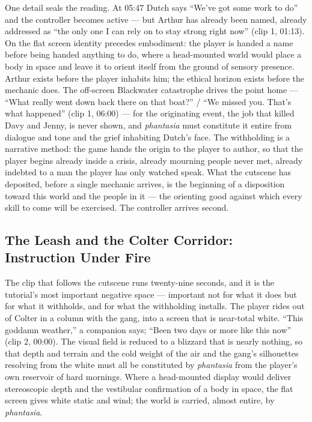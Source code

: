 \documentclass{article}
\begin{document}
One detail seals the reading. At 05:47 Dutch says ``We've got some work to do'' and the controller becomes active — but Arthur has already been named, already addressed as ``the only one I can rely on to stay strong right now'' (clip 1, 01:13). On the flat screen identity precedes embodiment: the player is handed a name before being handed anything to do, where a head-mounted world would place a body in space and leave it to orient itself from the ground of sensory presence. Arthur exists before the player inhabits him; the ethical horizon exists before the mechanic does. The off-screen Blackwater catastrophe drives the point home — ``What really went down back there on that boat?'' / ``We missed you. That's what happened'' (clip 1, 06:00) — for the originating event, the job that killed Davy and Jenny, is never shown, and \textit{phantasia} must constitute it entire from dialogue and tone and the grief inhabiting Dutch's face. The withholding is a narrative method: the game hands the origin to the player to author, so that the player begins already inside a crisis, already mourning people never met, already indebted to a man the player has only watched speak. What the cutscene has deposited, before a single mechanic arrives, is the beginning of a disposition toward this world and the people in it — the orienting good against which every skill to come will be exercised. The controller arrives second.

\bigskip

\subsection*{The Leash and the Colter Corridor: Instruction Under Fire}

The clip that follows the cutscene runs twenty-nine seconds, and it is the tutorial's most important negative space — important not for what it does but for what it withholds, and for what the withholding installs. The player rides out of Colter in a column with the gang, into a screen that is near-total white. ``This goddamn weather,'' a companion says; ``Been two days or more like this now'' (clip 2, 00:00). The visual field is reduced to a blizzard that is nearly nothing, so that depth and terrain and the cold weight of the air and the gang's silhouettes resolving from the white must all be constituted by \textit{phantasia} from the player's own reservoir of hard mornings. Where a head-mounted display would deliver stereoscopic depth and the vestibular confirmation of a body in space, the flat screen gives white static and wind; the world is carried, almost entire, by \textit{phantasia}.
\end{document}
